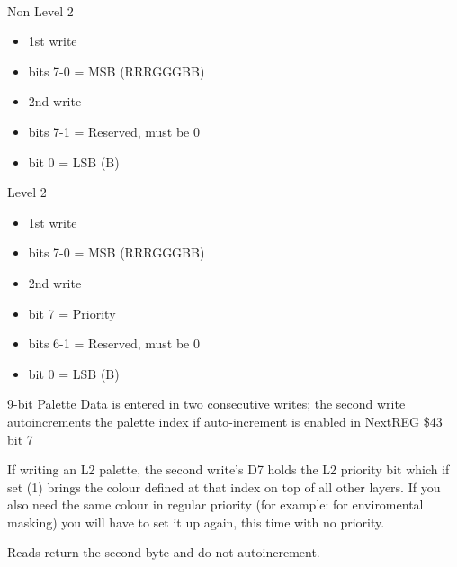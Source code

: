 \\
Non Level 2
\begin{itemize}
\item[] 1st write
\item bits 7-0 = MSB (RRRGGGBB)
\item[] 2nd write
\item bits 7-1 = Reserved, must be 0
\item bit 0 = LSB (B)
\end{itemize}
Level 2
\begin{itemize}
\item[] 1st write
\item bits 7-0 = MSB (RRRGGGBB)
\item[] 2nd write
\item bit 7 = Priority
\item bits 6-1 = Reserved, must be 0
\item bit 0 = LSB (B)
\end{itemize}
9-bit Palette Data is entered in two consecutive writes; the second
write autoincrements the palette index if auto-increment is enabled in
NextREG \$43 bit 7

If writing an L2 palette, the second write's D7 holds the L2 priority
bit which if set (1) brings the colour defined at that index on top of
all other layers. If you also need the same colour in regular priority
(for example: for enviromental masking) you will have to set it up
again, this time with no priority.

Reads return the second byte and do not autoincrement.

